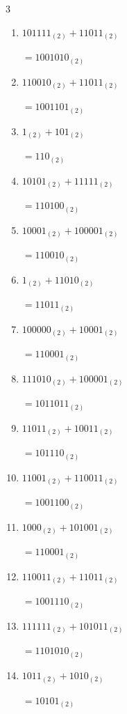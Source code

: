 \begin{multicols}{3}
\begin{enumerate}
  \item $101111_{(2)} + 11011_{(2)}$

        $=1001010_{(2)}$

  \item $110010_{(2)} + 11011_{(2)}$

        $=1001101_{(2)}$

  \item $1_{(2)} + 101_{(2)}$

        $=110_{(2)}$

  \item $10101_{(2)} + 11111_{(2)}$

        $=110100_{(2)}$

  \item $10001_{(2)} + 100001_{(2)}$

        $=110010_{(2)}$

  \item $1_{(2)} + 11010_{(2)}$

        $=11011_{(2)}$

  \item $100000_{(2)} + 10001_{(2)}$

        $=110001_{(2)}$

  \item $111010_{(2)} + 100001_{(2)}$

        $=1011011_{(2)}$

\columnbreak %

  \item $11011_{(2)} + 10011_{(2)}$

        $=101110_{(2)}$

  \item $11001_{(2)} + 110011_{(2)}$

        $=1001100_{(2)}$

  \item $1000_{(2)} + 101001_{(2)}$

        $=110001_{(2)}$

  \item $110011_{(2)} + 11011_{(2)}$

        $=1001110_{(2)}$

  \item $111111_{(2)} + 101011_{(2)}$

        $=1101010_{(2)}$

  \item $1011_{(2)} + 1010_{(2)}$

        $=10101_{(2)}$


\end{enumerate}
\end{multicols}
